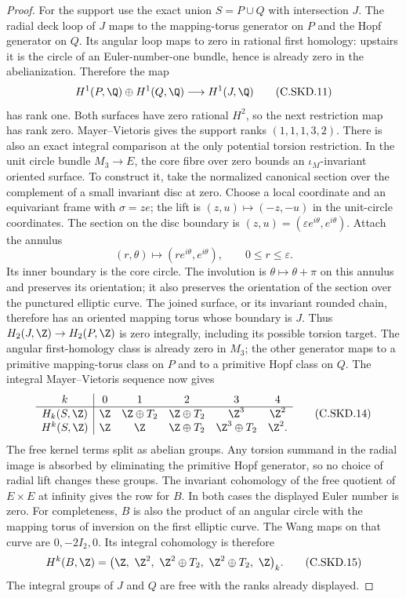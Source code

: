 \begin{proof}
For the support use the exact union
$S=P\cup Q$ with intersection $J$. The
radial deck loop of $J$ maps to the
mapping-torus generator on $P$ and the
Hopf generator on $Q$. Its angular loop
maps to zero in rational first homology:
upstairs it is the circle of an
Euler-number-one bundle, hence is already
zero in the abelianization. Therefore
the map
\[
           H^1(P,\Q)\oplus H^1(Q,\Q)
                         \longrightarrow H^1(J,\Q)
                                                            \tag{C.SKD.11}\label{cdp:eq:C.SKD.11}
\]
has rank one. Both surfaces have zero
rational $H^2$, so the next restriction
map has rank zero. Mayer--Vietoris gives
the support ranks $(1,1,1,3,2)$.
There is also an exact integral comparison at the only
potential torsion restriction. In the unit circle bundle
$M_3\to E$, the core fibre over zero bounds an
$\iota_M$-invariant oriented surface. To construct it,
take the normalized canonical section over the complement
of a small invariant disc at zero. Choose a local
coordinate and an equivariant frame with
$\sigma=z e$; the lift is
$(z,u)\mapsto(-z,-u)$ in the unit-circle coordinates.
The section on the disc boundary is
$(z,u)=(\varepsilon e^{i\theta},e^{i\theta})$.
Attach the annulus
\[
 (r,\theta)\longmapsto(re^{i\theta},e^{i\theta}),
                 \qquad 0\le r\le\varepsilon .
\]
Its inner boundary is the core circle. The involution
is $\theta\mapsto\theta+\pi$ on this annulus and
preserves its orientation; it also preserves the
orientation of the section over the punctured elliptic
curve. The joined surface, or its invariant rounded
chain, therefore has an oriented mapping torus whose
boundary is $J$. Thus
$H_2(J,\Z)\to H_2(P,\Z)$ is zero integrally,
including its possible torsion target. The angular
first-homology class is already zero in $M_3$;
the other generator maps to a primitive mapping-torus
class on $P$ and to a primitive Hopf class on $Q$.
The integral Mayer--Vietoris sequence now gives
\[
 \begin{array}{c|ccccc}
 k&0&1&2&3&4\\ \hline
 H_k(S,\Z)&
 \Z&\Z\oplus T_2&\Z\oplus T_2&\Z^3&\Z^2\\
 H^k(S,\Z)&
 \Z&\Z&\Z\oplus T_2&\Z^3\oplus T_2&\Z^2 .
 \end{array}                                             \tag{C.SKD.14}\label{cdp:eq:C.SKD.14}
\]
The free kernel terms split as abelian groups.
Any torsion summand in the radial image is absorbed
by eliminating the primitive Hopf generator, so
no choice of radial lift changes these groups.
The invariant cohomology of the free
quotient of $E\times E$ at infinity
gives the row for $B$. In both cases
the displayed Euler number is zero.
For completeness, $B$ is also the product of an
angular circle with the mapping torus of inversion
on the first elliptic curve. The Wang maps on
that curve are $0,-2I_2,0$. Its integral
cohomology is therefore
\[
 H^k(B,\Z)=
 \bigl(\Z,\ \Z^2,\ \Z^2\oplus T_2,\
                  \Z^2\oplus T_2,\ \Z\bigr)_k .
                                                            \tag{C.SKD.15}\label{cdp:eq:C.SKD.15}
\]
The integral groups of $J$ and $Q$ are free with
the ranks already displayed.


\end{proof}
